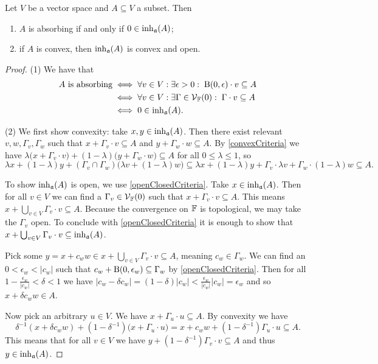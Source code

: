 \begin{proposition} \label{coreProperties}
Let $V$ be a vector space and $A \subseteq V$ a subset. Then
\begin{enumerate}
\item $A$ is absorbing \textup{if and only if} $0\in \operatorname{inh}_\mathfrak{a}(A)$;
\item if $A$ is convex, then $\operatorname{inh}_\mathfrak{a}(A)$ is convex and open.
\end{enumerate}
\end{proposition}
\begin{proof}
(1) We have that
\begin{align*}
\text{$A$ is absorbing} &\iff \forall v\in V: \exists \epsilon >0: \; \operatorname{B}(0,\epsilon)\cdot v\subseteq A \\
&\iff \forall v\in V: \exists \Gamma \in \operatorname{\mathcal{V}}_{\mathbb{F}}(0): \; \Gamma\cdot v\subseteq A \\
&\iff 0\in \operatorname{inh}_\mathfrak{a}(A).
\end{align*}

(2) We first show convexity: take $x,y \in \operatorname{inh}_\mathfrak{a}(A)$. Then there exist relevant $v,w,\Gamma_v,\Gamma_w$ such that $x+ \Gamma_v\cdot v \subseteq A$ and $y+ \Gamma_w\cdot w \subseteq A$. By \ref{convexCriteria} we have $\lambda \big(x+ \Gamma_v\cdot v\big) + (1-\lambda)\big(y+ \Gamma_w\cdot w\big)\subseteq A$ for all $0\leq \lambda \leq 1$, so
\[ \lambda x+(1-\lambda)y + (\Gamma_v\cap\Gamma_w)\big(\lambda v+(1-\lambda)w\big) \subseteq \lambda x+(1-\lambda)y + \Gamma_v\cdot \lambda v+\Gamma_w\cdot (1-\lambda)w \subseteq A. \]

To show $\operatorname{inh}_\mathfrak{a}(A)$ is open, we use \ref{openClosedCriteria}. Take $x\in \operatorname{inh}_\mathfrak{a}(A)$. Then for all $v\in V$ we can find a $\Gamma_v\in\operatorname{\mathcal{V}}_{\mathbb{F}}(0)$ such that $x+\Gamma_v\cdot v \subseteq A$. This means $x+\bigcup_{v\in V}\Gamma_v\cdot v \subseteq A$. Because the convergence on $\mathbb{F}$ is topological, we may take the $\Gamma_v$ open. To conclude with \ref{openClosedCriteria} it is enough to show that $x+\bigcup_{v\in V}\Gamma_v\cdot v \subseteq \operatorname{inh}_\mathfrak{a}(A)$.

Pick some $y = x+ c_w w \in x+ \bigcup_{v\in V}\Gamma_v\cdot v \subseteq A$, meaning $c_w\in\Gamma_w$. We can find an $0<\epsilon_w<|c_w|$ such that $c_w + \operatorname{B}(0,\epsilon_w) \subseteq \Gamma_w$ by \ref{openClosedCriteria}. Then for all $1-\frac{\epsilon_w}{|c_w|}<\delta<1$ we have $|c_w - \delta c_w| = (1-\delta)|c_w| < \frac{\epsilon_w}{|c_w|}|c_w| = \epsilon_w$ and so $x+ \delta c_w w \in A$.

Now pick an arbitrary $u\in V$. We have $x+\Gamma_u\cdot u \subseteq A$. By convexity we have
\[ \delta^{-1}(x+ \delta c_w w) + (1-\delta^{-1})\big(x+\Gamma_u\cdot u\big) = x + c_w w + (1-\delta^{-1})\Gamma_u\cdot u \subseteq A. \]
This means that for all $v\in V$ we have $y + (1-\delta^{-1})\Gamma_v\cdot v \subseteq A$ and thus $y\in \operatorname{inh}_\mathfrak{a}(A)$.
\end{proof}


